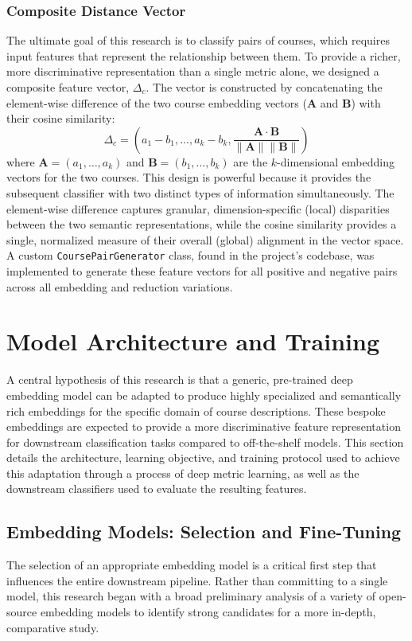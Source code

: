\subsubsection{Composite Distance Vector}\label{ch:3.2.3.2}
The ultimate goal of this research is to classify pairs of courses, which requires input features that represent the relationship between them. To provide a richer, more discriminative representation than a single metric alone, we designed a composite feature vector, \(\Delta_c\). The vector is constructed by concatenating the element-wise difference of the two course embedding vectors (\(\mathbf{A}\) and \(\mathbf{B}\)) with their cosine similarity:
\[ \Delta_c = \left(a_1 - b_1, \dots, a_k - b_k, \frac{\mathbf{A}\cdot\mathbf{B}}{\parallel \mathbf{A} \parallel \parallel \mathbf{B} \parallel } \right) \]
where \(\mathbf{A} = (a_1, \dots, a_k) \) and \(\mathbf{B} = (b_1, \dots, b_k) \) are the \(k\)-dimensional embedding vectors for the two courses. This design is powerful because it provides the subsequent classifier with two distinct types of information simultaneously. The element-wise difference captures granular, dimension-specific (local) disparities between the two semantic representations, while the cosine similarity provides a single, normalized measure of their overall (global) alignment in the vector space. A custom \verb|CoursePairGenerator| class, found in the project's codebase, was implemented to generate these feature vectors for all positive and negative pairs across all embedding and reduction variations.

\section{Model Architecture and Training}\label{ch:3.3}
A central hypothesis of this research is that a generic, pre-trained deep embedding model can be adapted to produce highly specialized and semantically rich embeddings for the specific domain of course descriptions. These bespoke embeddings are expected to provide a more discriminative feature representation for downstream classification tasks compared to off-the-shelf models. This section details the architecture, learning objective, and training protocol used to achieve this adaptation through a process of deep metric learning, as well as the downstream classifiers used to evaluate the resulting features.

\subsection{Embedding Models: Selection and Fine-Tuning}\label{ch:3.3.1}
The selection of an appropriate embedding model is a critical first step that influences the entire downstream pipeline. Rather than committing to a single model, this research began with a broad preliminary analysis of a variety of open-source embedding models to identify strong candidates for a more in-depth, comparative study.

